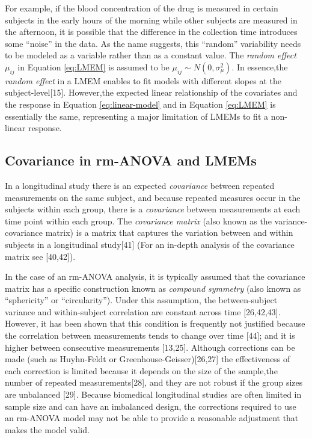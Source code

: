 \documentclass[
]{article}
\begin{document}
For example, if the blood concentration of the drug is measured in certain subjects in the early hours of the morning while other subjects are measured in the afternoon, it is possible that the difference in the collection time introduces some ``noise'' in the data. As the name suggests, this ``random'' variability needs to be modeled as a variable rather than as a constant value. The \emph{random effect} \(\mu_{ij}\) in Equation \eqref{eq:LMEM} is assumed to be \(\mu_{ij} \sim N(0,\sigma^2_\mu)\). In essence,the \emph{random effect} in a LMEM enables to fit models with different slopes at the subject-level{[}15{]}. However,the expected linear relationship of the covariates and the response in Equation \eqref{eq:linear-model} and in Equation \eqref{eq:LMEM} is essentially the same, representing a major limitation of LMEMs to fit a non-linear response.

\hypertarget{covariance-in-rm-anova-and-lmems}{%
\subsection{Covariance in rm-ANOVA and LMEMs}\label{covariance-in-rm-anova-and-lmems}}

In a longitudinal study there is an expected \emph{covariance} between repeated measurements on the same subject, and because repeated measures occur in the subjects within each group, there is a \emph{covariance} between measurements at each time point within each group. The \emph{covariance matrix} (also known as the variance-covariance matrix) is a matrix that captures the variation between and within subjects in a longitudinal study{[}41{]} (For an in-depth analysis of the covariance matrix see {[}40,42{]}).

In the case of an rm-ANOVA analysis, it is typically assumed that the covariance matrix has a specific construction known as \emph{compound symmetry} (also known as ``sphericity'' or ``circularity''). Under this assumption, the between-subject variance and within-subject correlation are constant across time {[}26,42,43{]}. However, it has been shown that this condition is frequently not justified because the correlation between measurements tends to change over time {[}44{]}; and it is higher between consecutive measurements {[}13,25{]}. Although corrections can be made (such as Huyhn-Feldt or Greenhouse-Geisser){[}26,27{]} the effectiveness of each correction is limited because it depends on the size of the sample,the number of repeated measurements{[}28{]}, and they are not robust if the group sizes are unbalanced {[}29{]}. Because biomedical longitudinal studies are often limited in sample size and can have an imbalanced design, the corrections required to use an rm-ANOVA model may not be able to provide a reasonable adjustment that makes the model valid.
\end{document}
